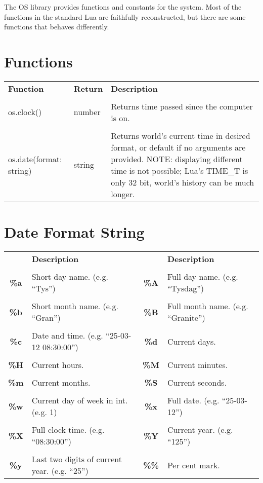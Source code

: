 The OS library provides functions and constants for the system. Most of the functions in the standard Lua are faithfully reconstructed, but there are some functions that behaves differently.

\section{Functions}

\begin{tabularx}{\textwidth}{l l X}
	\textbf{\large Function} & \textbf{\large Return} & \textbf{\large Description}
	\\ \\
	\endhead
	os.clock() & number & Returns time passed since the computer is on.
	\\ \\
	os.date(format: string) & string & Returns world's current time in desired format, or default if no arguments are provided. NOTE: displaying different time is not possible; Lua's TIME\_T is only 32 bit, world's history can be much longer.
\end{tabularx}

\section{Date Format String}

\begin{tabularx}{\textwidth}{c X c X}
	\textbf{\large } & \textbf{\large Description} & \textbf{\large } & \textbf{\large Description}
	\\ \\
	\endhead
	\textbf{\%a} & Short day name. (e.g. ``Tys'') & \textbf{\%A} & Full day name. (e.g. ``Tysdag'')
	\\ \\
	\textbf{\%b} & Short month name. (e.g. ``Gran'') & \textbf{\%B} & Full month name. (e.g. ``Granite'')
	\\ \\
	\textbf{\%c} & Date and time. (e.g. ``25-03-12 08:30:00'') & \textbf{\%d} & Current days.
	\\ \\
	\textbf{\%H} & Current hours. & \textbf{\%M} & Current minutes.
	\\ \\
	\textbf{\%m} & Current months. & \textbf{\%S} & Current seconds.
	\\ \\
	\textbf{\%w} & Current day of week in int. (e.g. 1) & \textbf{\%x} & Full date. (e.g. ``25-03-12'')
	\\ \\
	\textbf{\%X} & Full clock time. (e.g. ``08:30:00'') & \textbf{\%Y} & Current year. (e.g. ``125'')
	\\ \\
	\textbf{\%y} & Last two digits of current year. (e.g. ``25'') & \textbf{\%\%} & Per cent mark.
\end{tabularx}
